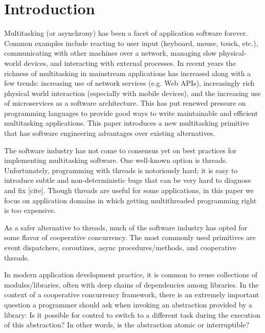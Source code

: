 \documentclass[9pt,preprint]{sigplanconf}
\begin{document}




\section{Introduction}

Multitasking (or asynchrony) has been a facet of application software forever.
Common examples include reacting to user input (keyboard, mouse, touch, etc.), communicating with other machines over a network, managing slow physical-world devices, and interacting with external processes.
In recent years the richness of multitasking in mainstream applications has increased along with a few trends: increasing use of network services (e.g. Web APIs), increasingly rich physical world interaction (especially with mobile devices), and the increasing use of microservices as a software architecture.
This has put renewed pressure on programming languages to provide good ways to write maintainable and efficient multitasking applications.
This paper introduces a new multitasking primitive that has software engineering advantages over existing alternatives.

The software industry has not come to consensus yet on best practices for implementing multitasking software.
One well-known option is threads.
Unfortunately, programming with threads is notoriously hard; it is easy to introduce subtle and non-deterministic bugs that can be very hard to diagnose and fix [cite].
Though threads are useful for some applications, in this paper we focus on application domains in which getting multithreaded programming right is too expensive.

As a safer alternative to threads, much of the software industry has opted for some flavor of cooperative concurrency.
The most commonly used primitives are event dispatchers, coroutines, async procedures/methods, and cooperative threads.

In modern application development practice, it is common to reuse collections of modules/libraries, often with deep chains of dependencies among libraries.
In the context of a cooperative concurrency framework, there is an extremely important question a programmer should ask when invoking an abstraction provided by a library:
Is it possible for control to switch to a different task during the execution of this abstraction?
In other words, is the abstraction atomic or interruptible?
\end{document}
